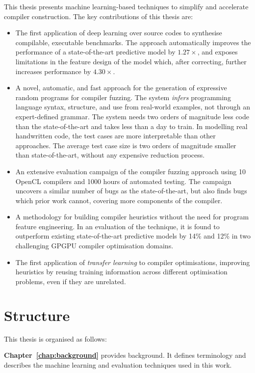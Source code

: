 This thesis presents machine learning-based techniques to simplify and accelerate compiler construction. The key contributions of this thesis are:

\begin{itemize}
  \item The first application of deep learning over source codes to synthesise compilable, executable benchmarks. The approach automatically improves the performance of a state-of-the-art predictive model by $1.27\times$, and exposes limitations in the feature design of the model which, after correcting, further increases performance by $4.30\times$.
  \item A novel, automatic, and fast approach for the generation of expressive random programs for compiler fuzzing. The system \emph{infers} programming language syntax, structure, and use from real-world examples, not through an expert-defined grammar. The system needs two orders of magnitude less code than the state-of-the-art and takes less than a day to train. In modelling real handwritten code, the test cases are more interpretable than other approaches. The average test case size is two orders of magnitude smaller than state-of-the-art, without any expensive reduction process.
  \item An extensive evaluation campaign of the compiler fuzzing approach using 10 OpenCL compilers and 1000 hours of automated testing. The campaign uncovers a similar number of bugs as the state-of-the-art, but also finds bugs which prior work cannot, covering more components of the compiler.
	\item A methodology for building compiler heuristics without the need for program feature engineering. In an evaluation of the technique, it is found to outperform existing state-of-the-art predictive models by 14\% and 12\% in two challenging GPGPU compiler optimisation domains.
	\item The first application of \emph{transfer learning} to compiler optimisations, improving heuristics by reusing training information across different optimisation problems, even if they are unrelated.
\end{itemize}


\section{Structure}

This thesis is organised as follows:

\textbf{Chapter~\ref{chap:background}} provides background. It defines terminology and describes the machine learning and evaluation techniques used in this work.

